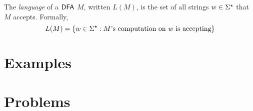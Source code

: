 The \textit{language} of a $\textsf{DFA}$ $M$, written $L(M)$, is the set of all strings $w \in \Sigma^\star$ that $M$ accepts. Formally,
\[
	L(M) = \{ w \in \Sigma^\star : \text{$M$'s computation on $w$ is accepting}\}
\]



\section{Examples}



\section{Problems}